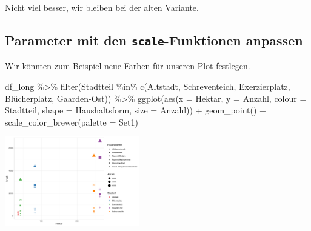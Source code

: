\documentclass[
]{book}
\newenvironment{Shaded}{\begin{snugshade}}{\end{snugshade}}
\newcommand{\AttributeTok}[1]{\textcolor[rgb]{0.77,0.63,0.00}{#1}}
\newcommand{\FunctionTok}[1]{\textcolor[rgb]{0.00,0.00,0.00}{#1}}
\newcommand{\NormalTok}[1]{#1}
\newcommand{\SpecialCharTok}[1]{\textcolor[rgb]{0.00,0.00,0.00}{#1}}
\newcommand{\StringTok}[1]{\textcolor[rgb]{0.31,0.60,0.02}{#1}}
\begin{document}
Nicht viel besser, wir bleiben bei der alten Variante.

\hypertarget{parameter-mit-den-scale-funktionen-anpassen}{%
\subsection{\texorpdfstring{Parameter mit den \texttt{scale}-Funktionen anpassen}{Parameter mit den scale-Funktionen anpassen}}\label{parameter-mit-den-scale-funktionen-anpassen}}

Wir könnten zum Beispiel neue Farben für unseren Plot festlegen.

\begin{Shaded}
\begin{Highlighting}[]
\NormalTok{df\_long }\SpecialCharTok{\%\textgreater{}\%} 
  \FunctionTok{filter}\NormalTok{(Stadtteil }\SpecialCharTok{\%in\%} \FunctionTok{c}\NormalTok{(}\StringTok{\textquotesingle{}Altstadt\textquotesingle{}}\NormalTok{, }
                          \StringTok{\textquotesingle{}Schreventeich\textquotesingle{}}\NormalTok{, }
                          \StringTok{\textquotesingle{}Exerzierplatz\textquotesingle{}}\NormalTok{, }
                          \StringTok{\textquotesingle{}Blücherplatz\textquotesingle{}}\NormalTok{,}
                          \StringTok{\textquotesingle{}Gaarden{-}Ost\textquotesingle{}}\NormalTok{)) }\SpecialCharTok{\%\textgreater{}\%} 
  \FunctionTok{ggplot}\NormalTok{(}\FunctionTok{aes}\NormalTok{(}\AttributeTok{x =}\NormalTok{ Hektar,}
             \AttributeTok{y =}\NormalTok{ Anzahl,}
             \AttributeTok{colour =}\NormalTok{ Stadtteil,}
             \AttributeTok{shape =}\NormalTok{ Haushaltsform,}
             \AttributeTok{size =}\NormalTok{ Anzahl)) }\SpecialCharTok{+}
  \FunctionTok{geom\_point}\NormalTok{() }\SpecialCharTok{+}
  \FunctionTok{scale\_color\_brewer}\NormalTok{(}\AttributeTok{palette =} \StringTok{\textquotesingle{}Set1\textquotesingle{}}\NormalTok{)}
\end{Highlighting}
\end{Shaded}

\begin{center}\includegraphics[width=166.666666666667pt]{imgs/point_aes3} \end{center}
\end{document}
